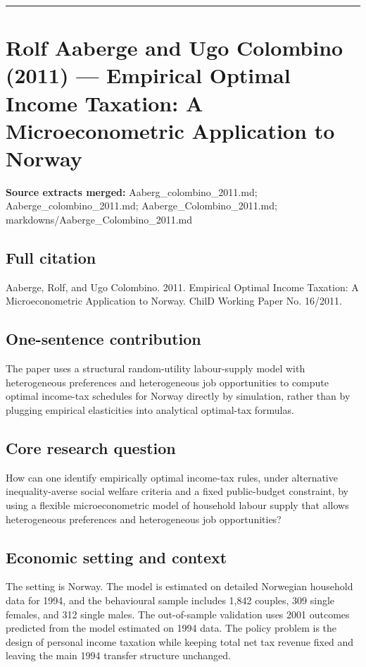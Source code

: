 \documentclass[11pt,a4paper]{article}
\begin{document}
\medskip\hrule\medskip

\section*{Rolf Aaberge and Ugo Colombino (2011) — Empirical Optimal Income Taxation: A Microeconometric Application to Norway}

\textbf{Source extracts merged:} Aaberg\_colombino\_2011.md; Aaberge\_colombino\_2011.md; Aaberge\_Colombino\_2011.md; markdowns/Aaberge\_Colombino\_2011.md

\subsection*{Full citation}
Aaberge, Rolf, and Ugo Colombino. 2011. Empirical Optimal Income Taxation: A Microeconometric Application to Norway. ChilD Working Paper No. 16/2011.

\subsection*{One-sentence contribution}
The paper uses a structural random-utility labour-supply model with heterogeneous preferences and heterogeneous job opportunities to compute optimal income-tax schedules for Norway directly by simulation, rather than by plugging empirical elasticities into analytical optimal-tax formulas.

\subsection*{Core research question}
How can one identify empirically optimal income-tax rules, under alternative inequality-averse social welfare criteria and a fixed public-budget constraint, by using a flexible microeconometric model of household labour supply that allows heterogeneous preferences and heterogeneous job opportunities?

\subsection*{Economic setting and context}
The setting is Norway. The model is estimated on detailed Norwegian household data for 1994, and the behavioural sample includes 1,842 couples, 309 single females, and 312 single males. The out-of-sample validation uses 2001 outcomes predicted from the model estimated on 1994 data. The policy problem is the design of personal income taxation while keeping total net tax revenue fixed and leaving the main 1994 transfer structure unchanged.
\end{document}

